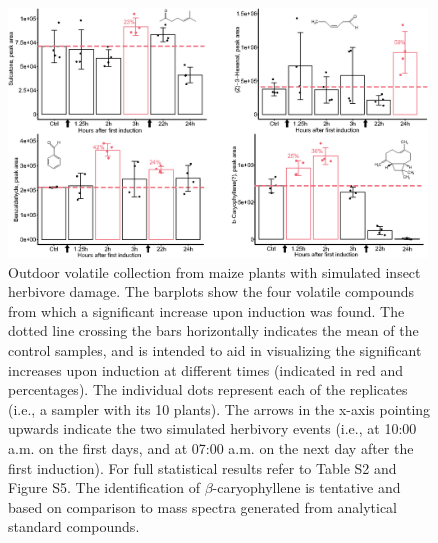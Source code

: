 \begin{figure}[!pht]
\centering
\includegraphics[width=0.99\textwidth]{figures/fig-4-results/figure_4_outdoor.eps}
\caption{Outdoor volatile collection from maize plants with simulated insect herbivore damage. The barplots show the four volatile compounds from which a significant increase upon induction was found. The dotted line crossing the bars horizontally indicates the mean of the control samples, and is intended to aid in visualizing the significant increases upon induction at different times (indicated in red and percentages). The individual dots represent each of the replicates (i.e., a sampler with its 10 plants). The arrows in the x-axis pointing upwards indicate the two simulated herbivory events (i.e., at 10:00 a.m. on the first days, and at 07:00 a.m. on the next day after the first induction). For full statistical results refer to Table S2 and Figure S5. The identification of $\beta$-caryophyllene is tentative and based on comparison to mass spectra generated from analytical standard compounds.}
\label{fig:outdoor_testing}
\end{figure}

